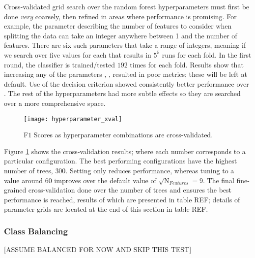             Cross-validated grid search over the random forest hyperparameters must first be done \textit{very} coarsely, then refined in areas where performance is promising. For example, the  parameter describing the number of features to consider when splitting the data can take an integer anywhere between 1 and the number of features. There are six such parameters that take a range of integers, meaning if we search over five values for each that results in $5^5$ runs for each fold. 
            In the first round, the classifier is trained/tested $192$ times for each fold. Results show that increasing any of the parameters , ,  resulted in poor metrics; these will be left at default. Use of the decision criterion  showed consistently better performance over . The rest of the hyperparameters had more subtle effects so they are searched over a more comprehensive space. 
            \begin{figure}[ht]
                \centering
                \texttt{[image: hyperparameter\_xval]}
                \caption{F$1$ Scores as hyperparameter combinations are cross-validated.}
                \label{fig:exp-clf-opt-hyp}
            \end{figure}
            
            Figure \ref{fig:exp-clf-opt-hyp} shows the cross-validation results; where each number corresponds to a particular configuration. The best performing configurations have the highest number of trees, $300$. Setting  only reduces performance, whereas tuning  to a value around $60$ improves over the default value of $\sqrt{ \text{N}_{Features}}=9$. The final fine-grained cross-validation done over the number of trees and  ensures the best performance is reached, results of which are presented in table REF; details of parameter grids are located at the end of this section in table REF.        
            
   

        \subsubsection{Class Balancing}
        \label{subsubsec:exp-clf-opt-class}
            
            [ASSUME BALANCED FOR NOW AND SKIP THIS TEST]
            

